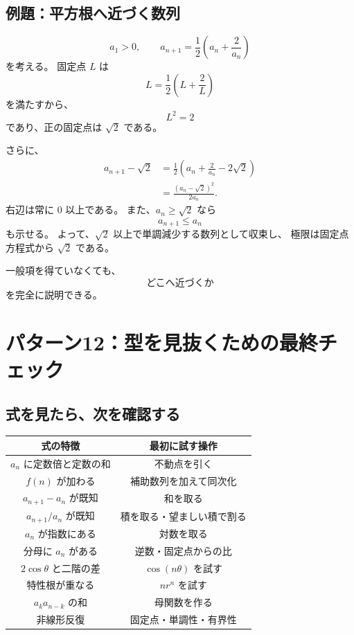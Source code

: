 \subsection{例題：平方根へ近づく数列}

\[
  a_1>0,\qquad
  a_{n+1}=\frac12\left(a_n+\frac{2}{a_n}\right)
\]
を考える。
固定点 $L$ は
\[
  L=\frac12\left(L+\frac2L\right)
\]
を満たすから、
\[
  L^2=2
\]
であり、正の固定点は $\sqrt2$ である。

さらに、
\[
  \begin{aligned}
    a_{n+1}-\sqrt2
     & =\frac12\left(a_n+\frac2{a_n}-2\sqrt2\right) \\
     & =\frac{(a_n-\sqrt2)^2}{2a_n}.
  \end{aligned}
\]
右辺は常に $0$ 以上である。
また、$a_n\ge\sqrt2$ なら
\[
  a_{n+1}\le a_n
\]
も示せる。
よって、$\sqrt2$ 以上で単調減少する数列として収束し、
極限は固定点方程式から $\sqrt2$ である。

一般項を得ていなくても、
\[
  \text{どこへ近づくか}
\]
を完全に説明できる。

\section{パターン12：型を見抜くための最終チェック}

\subsection{式を見たら、次を確認する}

\begin{center}
  \begin{tabular}{c|c}
    式の特徴                & 最初に試す操作             \\ \hline
    $a_n$ に定数倍と定数の和     & 不動点を引く              \\
    $f(n)$ が加わる         & 補助数列を加えて同次化         \\
    $a_{n+1}-a_n$ が既知   & 和を取る                \\
    $a_{n+1}/a_n$ が既知   & 積を取る・望ましい積で割る       \\
    $a_n$ が指数にある        & 対数を取る               \\
    分母に $a_n$ がある       & 逆数・固定点からの比          \\
    $2\cos\theta$ と二階の差 & $\cos(n\theta)$ を試す \\
    特性根が重なる             & $n r^n$ を試す         \\
    $a_ka_{n-k}$ の和     & 母関数を作る              \\
    非線形反復               & 固定点・単調性・有界性         \\
  \end{tabular}
\end{center}

